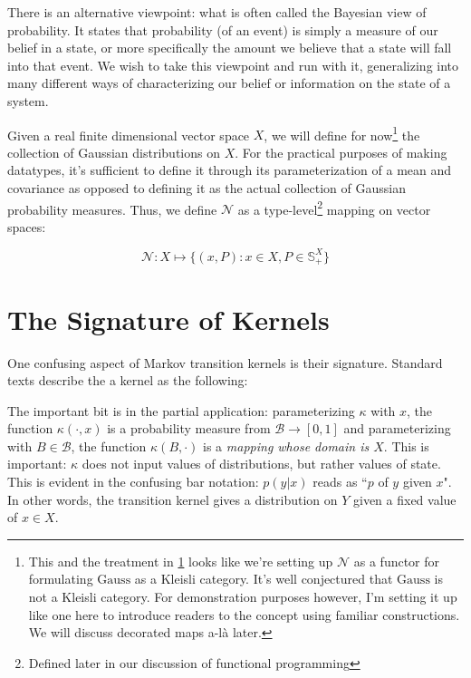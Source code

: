 There is an alternative viewpoint: what is often called the Bayesian view of probability.
It states that probability (of an event) is simply a measure of our belief in a state, or more specifically the amount we believe that a state will fall into that event.
We wish to take this viewpoint and run with it, generalizing into many different ways of characterizing our belief or information on the state of a system.

\newcommand{\gaussian}{\mathcal{N}}
\newcommand{\gausscat}{\mathrm{Gauss}}
Given a real finite dimensional vector space $X$, we will define for now\footnote{This and the treatment in \ref{sec:kernel-signature} looks like we're setting up $\gaussian$ as a functor for formulating $\gausscat$ as a Kleisli category. It's well conjectured that $\gausscat$ is not a Kleisli category. For demonstration purposes however, I'm setting it up like one here to introduce readers to the concept using familiar constructions. We will discuss decorated maps a-l\`a \cite{stein2022extended} later.} the collection of Gaussian distributions on $X$.
For the practical purposes of making datatypes, it's sufficient to define it through its parameterization of a mean and covariance as opposed to defining it as the actual collection of Gaussian probability measures.
Thus, we define $\gaussian$ as a type-level\footnote{Defined later in our discussion of functional programming} mapping on vector spaces:

\newcommand{\symmetric}{\mathds{S}}
\begin{equation}
    \gaussian : X \mapsto \{(x,P) : x\in X, P \in \symmetric^X_+\}
\end{equation}

\section{The Signature of Kernels}
\label{sec:kernel-signature}

One confusing aspect of Markov transition kernels is their signature. 
Standard texts describe the a kernel as the following:


The important bit is in the partial application: parameterizing $\kappa$ with $x$, the function $\kappa(\cdot, x)$ is a probability measure from $\mathcal{B} \rightarrow [0,1]$ and parameterizing with $B\in \mathcal{B}$, the function $\kappa(B,\cdot)$ is a \emph{mapping whose domain is $X$}.
This is important: $\kappa$ does not input values of distributions, but rather values of state.
This is evident in the confusing bar notation: $p(y|x)$ reads as ``$p$ of $y$ given $x$".
In other words, the transition kernel gives a distribution on $Y$ given a fixed value of $x\in X$.

